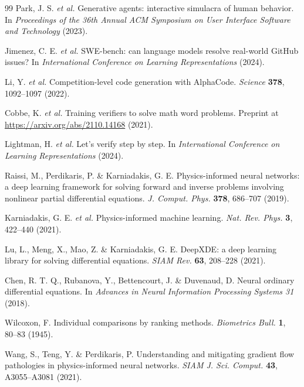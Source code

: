 \documentclass[11pt,a4paper]{article}
\begin{document}
\begin{thebibliography}{99}
 Park, J. S. \emph{et al.} Generative
agents: interactive simulacra of human behavior. In \emph{Proceedings of the
36th Annual ACM Symposium on User Interface Software and Technology} (2023).

 Jimenez, C. E. \emph{et al.}
SWE-bench: can language models resolve real-world GitHub issues? In
\emph{International Conference on Learning Representations} (2024).

 Li, Y. \emph{et al.} Competition-level code
generation with AlphaCode. \emph{Science} \textbf{378}, 1092--1097 (2022).

 Cobbe, K. \emph{et al.} Training
verifiers to solve math word problems. Preprint at
\url{https://arxiv.org/abs/2110.14168} (2021).

 Lightman, H. \emph{et al.}
Let's verify step by step. In \emph{International Conference on Learning
Representations} (2024).

 Raissi, M., Perdikaris, P. \&
Karniadakis, G. E. Physics-informed neural networks: a deep learning
framework for solving forward and inverse problems involving nonlinear
partial differential equations. \emph{J. Comput. Phys.} \textbf{378},
686--707 (2019).

 Karniadakis, G. E.
\emph{et al.} Physics-informed machine learning. \emph{Nat. Rev. Phys.}
\textbf{3}, 422--440 (2021).

 Lu, L., Meng, X., Mao, Z. \& Karniadakis,
G. E. DeepXDE: a deep learning library for solving differential equations.
\emph{SIAM Rev.} \textbf{63}, 208--228 (2021).

 Chen, R. T. Q., Rubanova, Y.,
Bettencourt, J. \& Duvenaud, D. Neural ordinary differential equations. In
\emph{Advances in Neural Information Processing Systems 31} (2018).

 Wilcoxon, F. Individual comparisons
by ranking methods. \emph{Biometrics Bull.} \textbf{1}, 80--83 (1945).

 Wang, S., Teng, Y. \& Perdikaris, P.
Understanding and mitigating gradient flow pathologies in physics-informed
neural networks. \emph{SIAM J. Sci. Comput.} \textbf{43}, A3055--A3081 (2021).


\end{thebibliography}
\end{document}
